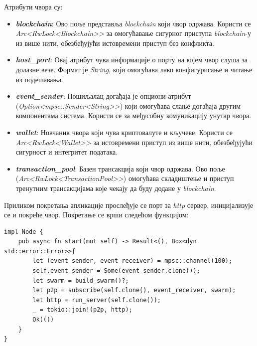 \documentclass[12pt, a4paper]{article}
\begin{document}
Атрибути чвора су:
\begin{itemize}
    \item \textbf{\textit{blockchain}}: Ово поље представља \textit{blockchain} који чвор одржава. Користи се \textit{Arc<RwLock<Blockchain>>} за омогућавање сигурног приступа \textit{blockchain}-у из више нити, обезбеђујући истовремени приступ без конфликта.
    \item \textbf{\textit{host\_port}}: Овај атрибут чува информације о порту на којем чвор слуша за долазне везе. Формат је \textit{String}, који омогућава лако конфигурисање и читање из подешавања.
    \item \textbf{\textit{event\_sender}}: Пошиљалац догађаја је опциони атрибут \linebreak(\textit{Option<mpsc::Sender<String>>}) који омогућава слање догађаја другим компонентама система. Користи се за међусобну комуникацију унутар чвора.
    \item \textbf{\textit{wallet}}: Новчаник чвора који чува криптовалуте и кључеве. Користи се \linebreak\textit{Arc<RwLock<Wallet>>} за истовремени приступ из више нити, обезбеђујући сигурност и интегритет података.
    \item \textbf{\textit{transaction\_pool}}: Базен трансакција који чвор одржава. Ово поље \linebreak(\textit{Arc<RwLock<TransactionPool>>}) омогућава складиштење и приступ тренутним трансакцијама које чекају да буду додане у \textit{blockchain}.
\end{itemize}
\newpage
Приликом покретања апликације прослеђује се порт за \textit{http} сервер, иницијализује се и покреће чвор. Покретање се врши следећом функцијом:

\begin{verbatim}
impl Node {
    pub async fn start(mut self) -> Result<(), Box<dyn std::error::Error>>{
        let (event_sender, event_receiver) = mpsc::channel(100);
        self.event_sender = Some(event_sender.clone());
        let swarm = build_swarm()?;
        let p2p = subscribe(self.clone(), event_receiver, swarm);
        let http = run_server(self.clone());
        _ = tokio::join!(p2p, http);
        Ok(())
    }
}
\end{verbatim}
\end{document}
